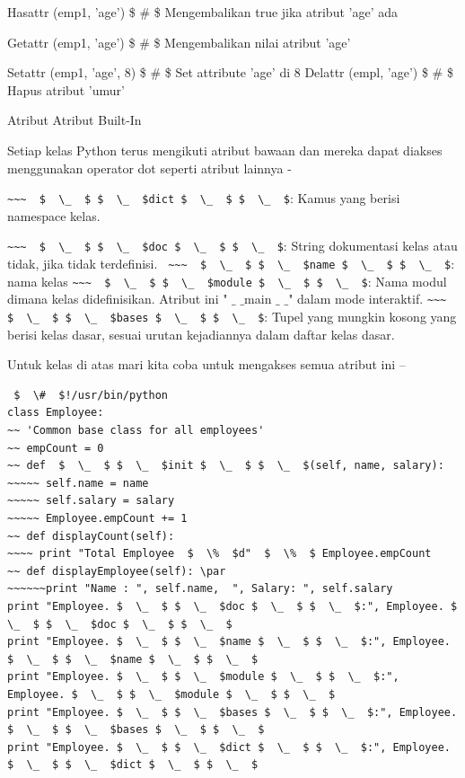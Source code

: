 Hasattr (emp1, 'age')  \$  \#  \$ Mengembalikan true jika atribut 'age' ada

Getattr (emp1, 'age')  \$  \#  \$ Mengembalikan nilai atribut 'age'

Setattr (emp1, 'age', 8)  \$  \#  \$ Set attribute 'age' di 8
\noindent
Delattr (empl, 'age')  \$  \#  \$ Hapus atribut 'umur'


Atribut Atribut Built-In

Setiap kelas Python terus mengikuti atribut bawaan dan mereka dapat diakses menggunakan operator dot seperti atribut lainnya -

\verb|~~~  $  \_  $ $  \_  $dict $  \_  $ $  \_  $|: Kamus yang berisi namespace kelas.

\verb|~~~  $  \_  $ $  \_  $doc $  \_  $ $  \_  $|: String dokumentasi kelas atau tidak, jika tidak terdefinisi.
\verb| ~~~  $  \_  $ $  \_  $name $  \_  $ $  \_  $|: nama kelas
\verb|~~~  $  \_  $ $  \_  $module $  \_  $ $  \_  $|: Nama modul dimana kelas didefinisikan. Atribut ini " $  \_  $ $  \_  $main $  \_  $ $  \_  $" dalam mode interaktif.
\verb|~~~  $  \_  $ $  \_  $bases $  \_  $ $  \_  $|: Tupel yang mungkin kosong yang berisi kelas dasar, sesuai urutan kejadiannya dalam daftar kelas dasar.

Untuk kelas di atas mari kita coba untuk mengakses semua atribut ini –
\begin{verbatim}
 $  \#  $!/usr/bin/python
class Employee:
~~ 'Common base class for all employees'
~~ empCount = 0
~~ def  $  \_  $ $  \_  $init $  \_  $ $  \_  $(self, name, salary):
~~~~~ self.name = name
~~~~~ self.salary = salary
~~~~~ Employee.empCount += 1
~~ def displayCount(self):
~~~~ print "Total Employee  $  \%  $d"  $  \%  $ Employee.empCount
~~ def displayEmployee(self): \par
~~~~~~print "Name : ", self.name,  ", Salary: ", self.salary
print "Employee. $  \_  $ $  \_  $doc $  \_  $ $  \_  $:", Employee. $  \_  $ $  \_  $doc $  \_  $ $  \_  $
print "Employee. $  \_  $ $  \_  $name $  \_  $ $  \_  $:", Employee. $  \_  $ $  \_  $name $  \_  $ $  \_  $
print "Employee. $  \_  $ $  \_  $module $  \_  $ $  \_  $:", Employee. $  \_  $ $  \_  $module $  \_  $ $  \_  $
print "Employee. $  \_  $ $  \_  $bases $  \_  $ $  \_  $:", Employee. $  \_  $ $  \_  $bases $  \_  $ $  \_  $
print "Employee. $  \_  $ $  \_  $dict $  \_  $ $  \_  $:", Employee. $  \_  $ $  \_  $dict $  \_  $ $  \_  $
\end{verbatim}

